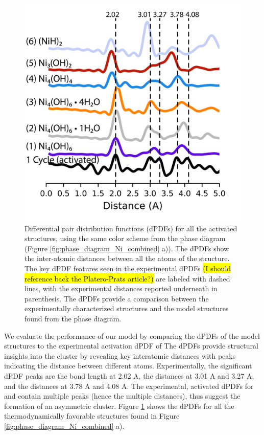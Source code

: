 \documentclass[journal=jctcce,manuscript=article]{achemso}
\begin{document}
\begin{figure}[H]
    \centering
    \includegraphics{zi-images/01-Ni-Graphics/2021-03-03-Ni-trans-dPDFs-manuscript.png}
    \caption{Differential pair distribution functions (dPDFs) for all the activated structures, using the same color scheme from the  phase diagram (Figure \ref{fig:phase_diagram_Ni_combined} a)). The dPDFs show the inter-atomic distances between all the atoms of the structure. The key dPDF features seen in the experimental dPDFs \hl{(I should reference back the Platero-Prats article?)} are labeled with dashed lines, with the experimental distances reported underneath in parenthesis. The dPDFs provide a comparison between the experimentally characterized structures and the model structures found from the phase diagram.}
    \label{fig:dPDFs_TandP_trans_Ni}
\end{figure}

We evaluate the performance of our model by comparing the dPDFs of the model structures to the experimental activation dPDF of \citeauthor{PlateroPrats2017} The dPDFs provide structural insights into the cluster by revealing key interatomic distances with peaks indicating the distance between different atoms. Experimentally, the significant dPDF peaks are the  bond length at 2.02 A, the  distances at 3.01 A and 3.27 A, and the  distances at 3.78 A and 4.08 A. The experimental, activated dPDFs for  and  contain multiple peaks (hence the multiple distances), thus suggest the formation of an asymmetric cluster. Figure \ref{fig:dPDFs_TandP_trans_Ni} shows the dPDFs for all the thermodynamically favorable structures found in Figure \ref{fig:phase_diagram_Ni_combined} a). 
\end{document}
